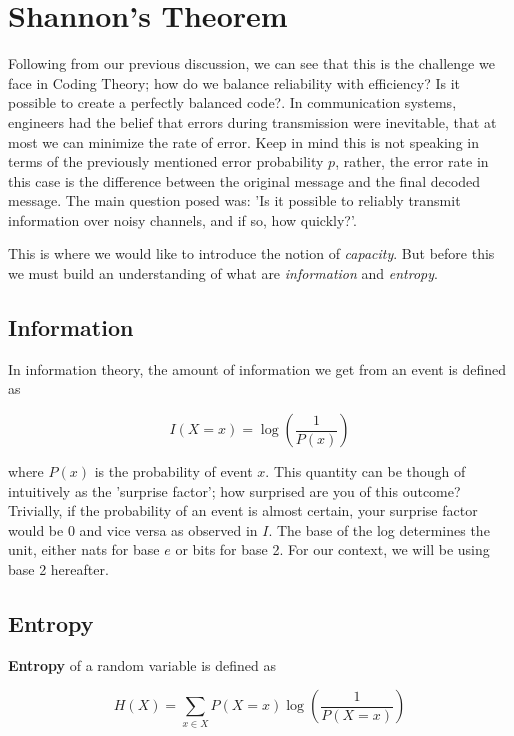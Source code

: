 \section{Shannon's Theorem}

Following from our previous discussion, we can see that this is the challenge we face in Coding Theory; how do we balance reliability with efficiency? Is it possible to create a perfectly balanced code?. In communication systems, engineers had the belief that errors during transmission were inevitable, that at most we can minimize the rate of error. Keep in mind this is not speaking in terms of the previously mentioned error probability $p$, rather, the error rate in this case is the difference between the original message and the final decoded message. The main question posed was: 'Is it possible to reliably transmit information over noisy channels, and if so, how quickly?'.

This is where we would like to introduce the notion of \textit{capacity}. But before this we must build an understanding of what are \textit{information} and \textit{entropy}. \\

\subsection{Information}
In information theory, the amount of information we get from an event is defined as 

\begin{equation}
    I(X = x) = \log( \frac{1}{P(x)} )
    \label{eq:info}
\end{equation}


where $P(x)$ is the probability of event $x$. This quantity can be though of intuitively as the 'surprise factor'; how surprised are you of this outcome? Trivially, if the probability of an event is almost certain, your surprise factor would be 0 and vice versa as observed in $I$. The base of the log determines the unit, either nats for base $e$ or bits for base 2. For our context, we will be using base 2 hereafter. \\

\subsection{Entropy}
\textbf{Entropy} of a random variable is defined as

\begin{equation}
\label{eqn:entropy}
    H(X) = \sum_{x \in X}{P(X=x)\log\left( \frac{1}{P(X=x)} \right)}
\end{equation}


